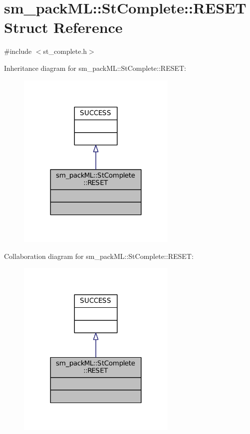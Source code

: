 \hypertarget{structsm__packML_1_1StComplete_1_1RESET}{}\section{sm\+\_\+pack\+ML\+:\+:St\+Complete\+:\+:R\+E\+S\+ET Struct Reference}
\label{structsm__packML_1_1StComplete_1_1RESET}


{\ttfamily \#include $<$st\+\_\+complete.\+h$>$}



Inheritance diagram for sm\+\_\+pack\+ML\+:\+:St\+Complete\+:\+:R\+E\+S\+ET\+:
\nopagebreak
\begin{figure}[H]
\begin{center}
\leavevmode
\includegraphics[width=216pt]{structsm__packML_1_1StComplete_1_1RESET__inherit__graph}
\end{center}
\end{figure}


Collaboration diagram for sm\+\_\+pack\+ML\+:\+:St\+Complete\+:\+:R\+E\+S\+ET\+:
\nopagebreak
\begin{figure}[H]
\begin{center}
\leavevmode
\includegraphics[width=216pt]{structsm__packML_1_1StComplete_1_1RESET__coll__graph}
\end{center}
\end{figure}


